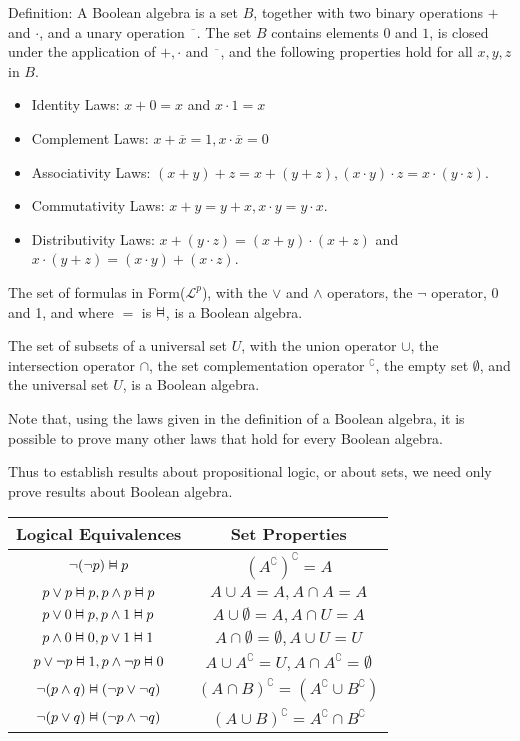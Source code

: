 \documentclass{article}
\newcommand{\vDashv}{%
  \mathrel{%
    \text{%
      \ooalign{$\vDash$\cr\reflectbox{$\vDash$}\cr}%
    }%
  }%
}
\begin{document}
Definition: A Boolean algebra is a set $B$, together with two binary operations $+$ and $\cdot$, and a unary operation $\overline{\phantom{a}}$. The set $B$ contains elements $0$ and $1$, is closed under the application of $+, \cdot$ and $\overline{\phantom{a}}$, and the following properties hold for all $x,y,z$ in $B$. 
\begin{itemize}
    \item Identity Laws: $x + 0 = x$ and $x \cdot 1 = x$
    \item Complement Laws: $x + \overline{x} = 1, x \cdot \overline{x} = 0$
    \item Associativity Laws: $(x+y) + z = x + (y + z), (x \cdot y) \cdot z = x \cdot (y \cdot z)$. 
    \item Commutativity Laws: $x + y = y + x, x \cdot y = y \cdot x$.
    \item Distributivity Laws: $x + (y \cdot z) = (x + y) \cdot (x + z)$ and $x \cdot (y + z) = (x \cdot y) + (x \cdot z)$.
\end{itemize}


The set of formulas in Form($\mathcal{L}^p$), with the $\vee$ and $\wedge$ operators, the $\neg$ operator, 0 and 1, and where $=$ is $\vDashv$, is a Boolean algebra. 

The set of subsets of a universal set $U$, with the union operator $\cup$, the intersection operator $\cap$, the set complementation operator $^\complement$, the empty set $\emptyset$, and the universal set $U$, is a Boolean algebra. 

Note that, using the laws given in the definition of a Boolean algebra, it is possible to prove many other laws that hold for every Boolean algebra. 

Thus to establish results about propositional logic, or about sets, we need only prove results about Boolean algebra. 

\begin{table}[h]
    \centering
    \begin{tabular}{|c|c|} \hline
         Logical Equivalences& Set Properties\\ \hline
         $\neg(\neg p) \vDashv p$& $(A^\complement)^\complement = A$\\ \hline
         $p \vee p \vDashv p, p \wedge p \vDashv p$ & $A \cup A = A, A \cap A = A$\\\hline
         $p \vee 0 \vDashv p, p \wedge 1 \vDashv p$& $A \cup \emptyset = A, A \cap U = A$\\\hline
         $p \wedge 0 \vDashv 0, p \vee 1 \vDashv 1$& $A \cap \emptyset = \emptyset, A \cup U = U$\\
         $p \vee \neg p \vDashv 1, p \wedge \neg p \vDashv 0$& $A \cup A^\complement = U, A \cap A^\complement = \emptyset$\\\hline
         $\neg(p \wedge q) \vDashv (\neg p \vee \neg q)$& $(A \cap B)^\complement = (A^\complement \cup B^\complement)$\\\hline
         $\neg(p \vee q) \vDashv (\neg p \wedge \neg q)$& $(A \cup B)^\complement = A^\complement \cap B^\complement$\\ \hline
    \end{tabular}
\end{table}
\end{document}
